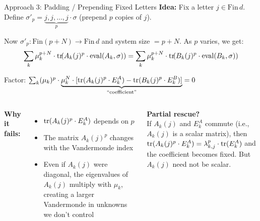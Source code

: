 \documentclass[aspectratio=169,10pt]{beamer}
\begin{document}
\begin{frame}{Approach 3: Padding / Prepending Fixed Letters}
\vspace{-0.3em}
{\small\textbf{Idea:} Fix a letter $j \in \mathrm{Fin}\,d$. Define $\sigma'_p = \underbrace{j, j, \dots, j}_{p} \cdot \sigma$ (prepend $p$ copies of $j$).}

{\small Now $\sigma'_p : \mathrm{Fin}(p + N) \to \mathrm{Fin}\,d$ and system size $= p + N$. As $p$ varies, we get:}
\[
\sum_k \mu_k^{p+N} \cdot \mathrm{tr}\!(A_k(j)^p \cdot \mathrm{eval}(A_k, \sigma))
= \sum_k \mu_k^{p+N} \cdot \mathrm{tr}\!(B_k(j)^p \cdot \mathrm{eval}(B_k, \sigma))
\]

\vspace{0.2em}
{\small Factor: $\sum_k (\mu_k)^p \cdot \underbrace{\mu_k^N \cdot
[\mathrm{tr}(A_k(j)^p \cdot E^A_k) - \mathrm{tr}(B_k(j)^p \cdot E^B_k)]}_{\text{``coefficient''}} = 0$}

\vspace{0.4em}
\begin{columns}[T]
{\small\textbf{\textcolor{softred}{Why it fails:}}}
\begin{itemize}\itemsep0.1em
  \item $\mathrm{tr}(A_k(j)^p \cdot E^A_k)$ depends on $p$
  \item The matrix $A_k(j)^p$ changes with the Vandermonde index
  \item Even if $A_k(j)$ were diagonal, the eigenvalues of $A_k(j)$ multiply with $\mu_k$, creating a larger Vandermonde in unknowns we don't control
\end{itemize}

{\small\textbf{\textcolor{amber}{Partial rescue?}}}\\[0.2em]
{\scriptsize If $A_k(j)$ and $E^A_k$ commute (i.e., $A_k(j)$ is a scalar matrix), then $\mathrm{tr}(A_k(j)^p \cdot E^A_k) = \lambda_{k,j}^p \cdot \mathrm{tr}(E^A_k)$ and the coefficient becomes fixed. But $A_k(j)$ need not be scalar.}
\end{columns}

\vspace{0.3em}
\end{frame}
\end{document}
